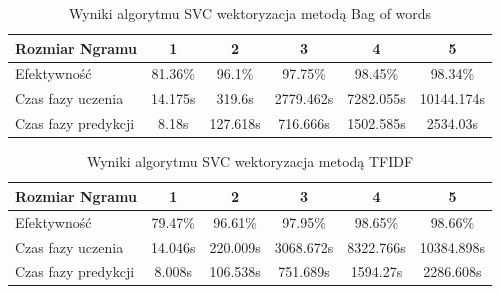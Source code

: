 \begin{table}[H]
    \centering
    \caption{Wyniki algorytmu Naive Bayes wektoryzacja metodą TFIDF}
\end{table}

\begin{table}[H]
    \centering
    \caption{Wyniki algorytmu SVC wektoryzacja metodą Bag of words}
    \begin{tabular}{ | l | c | c | c | c | c |}
        \hline
        Rozmiar Ngramu & 1 & 2 & 3 & 4 & 5 \\ \hline
        Efektywność & 81.36\% & 96.1\% & 97.75\% & 98.45\% & 98.34\%   \\ \hline
        Czas fazy uczenia & 14.175s & 319.6s & 2779.462s & 7282.055s & 10144.174s  \\ \hline
        Czas fazy predykcji & 8.18s & 127.618s & 716.666s & 1502.585s & 2534.03s  \\ \hline
    \end{tabular}
\end{table}

\begin{table}[H]
    \centering
    \caption{Wyniki algorytmu SVC wektoryzacja metodą TFIDF}
    \begin{tabular}{ | l | c | c | c | c | c |}
        \hline
        Rozmiar Ngramu & 1 & 2 & 3 & 4 & 5   \\ \hline
        Efektywność & 79.47\% & 96.61\% & 97.95\% & 98.65\% & 98.66\% \\ \hline
        Czas fazy uczenia & 14.046s & 220.009s & 3068.672s & 8322.766s & 10384.898s \\ \hline
        Czas fazy predykcji & 8.008s & 106.538s & 751.689s & 1594.27s & 2286.608s  \\ \hline
    \end{tabular}
\end{table}

